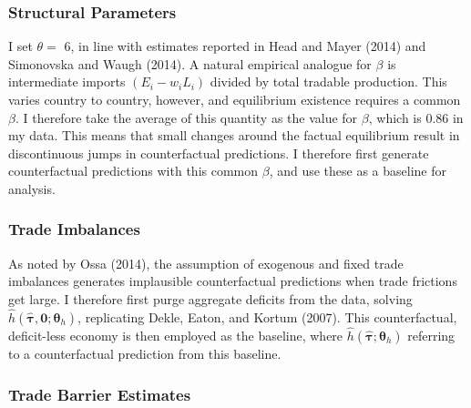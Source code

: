 \documentclass{puthesis}
\begin{document}
\subsubsection{Structural Parameters}

I set \(\theta =\) 6, in line with estimates reported in Head and Mayer
(2014) and Simonovska and Waugh (2014). A natural empirical analogue for
\(\beta\) is intermediate imports \((E_i - w_i L_i)\) divided by total
tradable production. This varies country to country, however, and
equilibrium existence requires a common \(\beta\). I therefore take the
average of this quantity as the value for \(\beta\), which is 0.86 in my
data. This means that small changes around the factual equilibrium
result in discontinuous jumps in counterfactual predictions. I therefore
first generate counterfactual predictions with this common \(\beta\),
and use these as a baseline for analysis.

\subsubsection{Trade Imbalances}

As noted by Ossa (2014), the assumption of exogenous and fixed trade
imbalances generates implausible counterfactual predictions when trade
frictions get large. I therefore first purge aggregate deficits from the
data, solving \(\hat{h}(\hat{\bm{\tau}}, \bm{0}; \bm{\theta}_h)\),
replicating Dekle, Eaton, and Kortum (2007). This counterfactual,
deficit-less economy is then employed as the baseline, where
\(\hat{h}(\hat{\bm{\tau}}; \bm{\theta}_h)\) referring to a
counterfactual prediction from this baseline.

\subsubsection{Trade Barrier Estimates}
\end{document}

